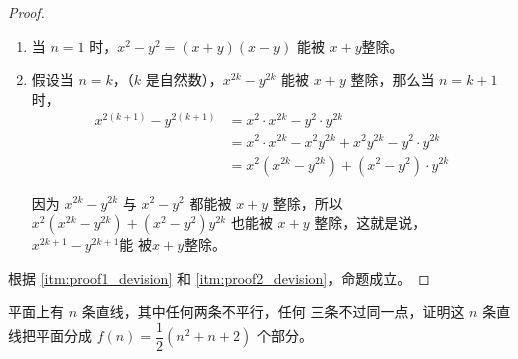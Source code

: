 \begin{proof}
\begin{enumerate}
    \item\label{itm:proof1_devision} 当 $n=1$ 时，$x^2-y^2=(x+y)(x-y)$ 能被
    $x+y$整除。
    \item\label{itm:proof2_devision} 假设当 $n=k$，（$k$ 是自然数），$x^{2k}-y^{2k}$ 能被 $x+y$ 整除，那么当 $n=k+1$ 时，
\[\begin{split}
    x^{2(k+1)}-y^{2(k+1)}
    &=x^2\cdot x^{2k}-y^2\cdot y^{2k}\\
    &=x^2\cdot x^{2k}-x^2y^{2k}+x^2y^{2k}-y^2\cdot y^{2k}\\
    &=x^2(x^{2k}-y^{2k})+(x^2-y^2)\cdot y^{2k}
\end{split}\]
    
    因为 $x^{2k}-y^{2k}$ 与 $x^2-y^2$ 都能被 $x+y$ 整除，所以 $x^2(x^{2k}-y^{2k})+(x^2-y^2)y^{2k}$ 也能被 $x+y$ 整除，这就是说，$x^{2k+1}-y^{2k+1} $能
    被$x+y$整除。
\end{enumerate}  

根据 \ref{itm:proof1_devision} 和 \ref{itm:proof2_devision}，命题成立。
\end{proof}

\begin{example}\label{exp:lines}
    平面上有 $n$ 条直线，其中任何两条不平行，任何
三条不过同一点，证明这 $n$ 条直线把平面分成 $f(n)=\dfrac{1}{2}
(n^2+n+2)$ 个部分。
\end{example}

